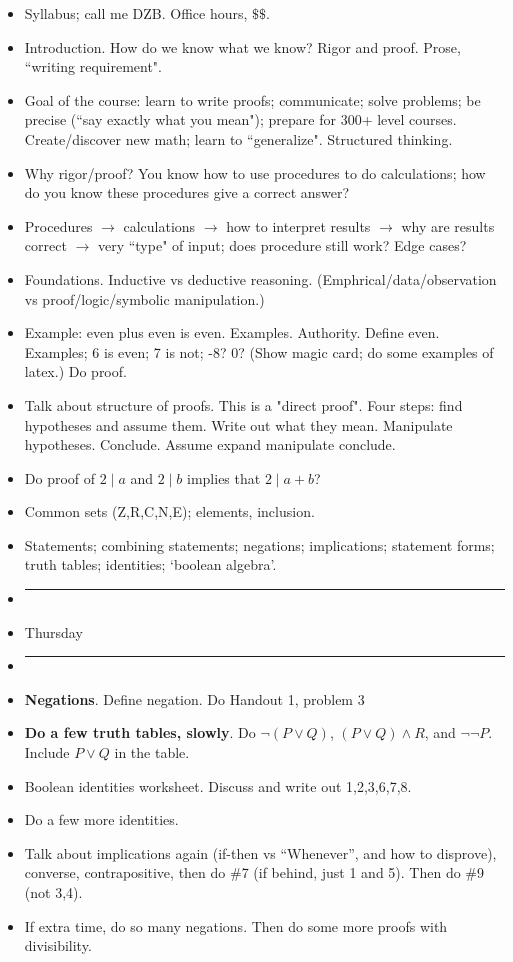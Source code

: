 \documentclass[12pt]{article}
\begin{document}
\begin{itemize}
\item Syllabus; call me DZB. Office hours, $\$\$$.
\item Introduction. How do we know what we know? Rigor and proof. Prose, ``writing requirement". 
\item Goal of the course: learn to write proofs; communicate; solve problems; be precise (``say exactly what you mean"); prepare for 300+ level courses. Create/discover new math; learn to ``generalize". Structured thinking.
\item Why rigor/proof? You know how to use procedures to do calculations; how do you know these procedures give a correct answer? 
\item Procedures $\to$ calculations $\to$ how to interpret results $\to$ why are results correct $\to$ very ``type" of input; does procedure still work? Edge cases?

\item Foundations. Inductive vs deductive reasoning. (Emphrical/data/observation vs proof/logic/symbolic manipulation.)
\item Example: even plus even is even. Examples. Authority. Define even. Examples; 6 is even; 7 is not; -8? 0? (Show magic card; do some examples of latex.) Do proof. 
\item Talk about structure of proofs. This is a "direct proof". Four steps: find hypotheses and assume them. Write out what they mean. Manipulate hypotheses. Conclude. Assume expand manipulate conclude.
\item Do proof of $2 \mid a$ and $2 \mid b$ implies that $2 \mid a + b$?
\item Common sets (Z,R,C,N,E); elements, inclusion.

\item Statements; combining statements; negations; implications; statement forms; truth tables; identities; `boolean algebra'.

\item []       \vspace{0.1cm}\hrule\vspace{-0.4cm}
\item Thursday
\item []       \vspace{0.1cm}\hrule\vspace{-0.4cm}  
\item \textbf{Negations}. Define negation. Do Handout 1, problem 3
\item \textbf{Do a few truth tables, slowly}. Do $\neg (P \vee Q)$, $(P \vee Q) \wedge R$, and $\neg \neg P$. Include $P \vee Q$ in the table.
\item  Boolean identities worksheet. Discuss and write out 1,2,3,6,7,8.
\item Do a few more identities.
\item Talk about implications again (if-then vs ``Whenever'', and how to disprove), converse, contrapositive, then do \#7 (if behind, just 1 and 5). Then do \#9 (not 3,4).

\item If extra time, do so many negations. Then do some more proofs with divisibility.
\end{itemize}
\end{document}
